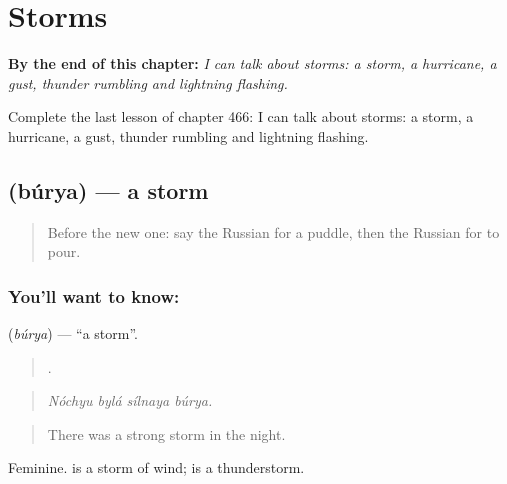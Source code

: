 
\chapter{Storms}
\label{ch:ru-storms}

\begin{chapteropening}
\textbf{By the end of this chapter:} \emph{I can talk about storms: a storm, a hurricane, a gust, thunder rumbling and lightning flashing.}

Complete the last lesson of chapter 466: I can talk about storms: a storm, a hurricane, a gust, thunder rumbling and lightning flashing.
\end{chapteropening}

\section[\texorpdfstring{\ru{буря} (búrya)}{буря (búrya)}]{ (búrya) — a storm}

\label{lesson:RU-C466-burya}



\begin{quote}
Before the new one: say the Russian for a puddle, then the Russian for to pour.
\end{quote}

\subsection*{You'll want to know: }
\textbf{} (\emph{búrya}) — \textquotedblleft{}a storm\textquotedblright{}.

\begin{quote}
   .
\end{quote}

\begin{quote}
\emph{Nóchyu bylá sílnaya búrya.}
\end{quote}

\begin{quote}
There was a strong storm in the night.
\end{quote}

Feminine. \emph{} is a storm of wind; \emph{} is a thunderstorm.

